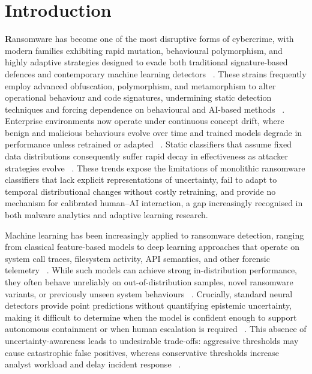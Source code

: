 \documentclass[3p]{elsarticle}
\begin{document}
\section{Introduction}
\label{sec:introduction}

\noindent\textbf{R}ansomware has become one of the most disruptive forms of cybercrime, with modern families exhibiting rapid mutation, behavioural polymorphism, and highly adaptive strategies designed to evade both traditional signature-based defences and contemporary machine learning detectors ~\cite{fernando2020study, razaulla2023age}. These strains frequently employ advanced obfuscation, polymorphism, and metamorphism to alter operational behaviour and code signatures, undermining static detection techniques and forcing dependence on behavioural and AI-based methods ~\cite{fernando2020study, Urooj2024polymorphism}. Enterprise environments now operate under continuous concept drift, where benign and malicious behaviours evolve over time and trained models degrade in performance unless retrained or adapted ~\cite{Ceschin2022ConceptDrift}. Static classifiers that assume fixed data distributions consequently suffer rapid decay in effectiveness as attacker strategies evolve ~\cite{Fernando2024FeSAD, razaulla2023age}. These trends expose the limitations of monolithic ransomware classifiers that lack explicit representations of uncertainty, fail to adapt to temporal distributional changes without costly retraining, and provide no mechanism for calibrated human–AI interaction, a gap increasingly recognised in both malware analytics and adaptive learning research.

Machine learning has been increasingly applied to ransomware detection, ranging from classical feature-based models to deep learning approaches that operate on system call traces, filesystem activity, API semantics, and other forensic telemetry ~\cite{alraizza2023ransomware, zahoora2022Deep}. While such models can achieve strong in-distribution performance, they often behave unreliably on out-of-distribution samples, novel ransomware variants, or previously unseen system behaviours ~\cite{fernando2020study}. Crucially, standard neural detectors provide point predictions without quantifying epistemic uncertainty, making it difficult to determine when the model is confident enough to support autonomous containment or when human escalation is required ~\cite{Doan2024uncertainBay}. This absence of uncertainty-awareness leads to undesirable trade-offs: aggressive thresholds may cause catastrophic false positives, whereas conservative thresholds increase analyst workload and delay incident response ~\cite{Ispahany2024Survey}.
\end{document}
